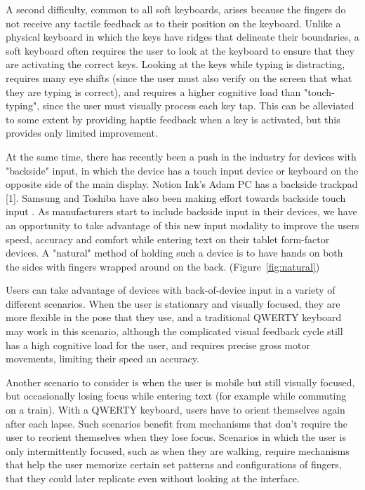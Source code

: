 A second difficulty, common to all soft keyboards, arises because the
fingers do not receive any tactile feedback as to their position on
the keyboard.  Unlike a physical keyboard in which the keys have
ridges that delineate their boundaries, a soft keyboard often requires
the user to look at the keyboard to ensure that they are activating
the correct keys.  Looking at the keys while typing is distracting,
requires many eye shifts (since the user must also verify on the
screen that what they are typing is correct), and requires a higher
cognitive load than "touch-typing", since the user must visually
process each key tap.  This can be alleviated to some extent by
providing haptic feedback when a key is activated, but this provides
only limited improvement.

At the same time, there has recently been a push in the industry for
devices with "backside" input, in which the device has a touch input
device or keyboard on the opposite side of the main display. Notion
Ink's Adam PC has a backside trackpad [1]. Samsung and Toshiba have
also been making effort towards backside touch input
. As manufacturers start to include backside input in their devices, we have an opportunity to take advantage of this new input modality to improve the users speed, accuracy and comfort while entering text on their tablet form-factor devices.  A "natural" method of holding such a device is to have hands on both the sides with fingers wrapped around on the back.
(Figure~\ref{fig:natural})

Users can take advantage of devices with back-of-device input in a variety
of different scenarios. When the user is stationary and visually
focused, they are more flexible in the pose that they use, and a
traditional QWERTY keyboard may work in this scenario, although the
complicated visual feedback cycle still has a high cognitive load for
the user, and requires precise gross motor movements, limiting their speed an accuracy. 

Another scenario to consider is when the user is mobile but still
visually focused, but occasionally losing focus while entering
text (for example while commuting on a train).  With a QWERTY keyboard,
users have to orient themselves again after each lapse. Such scenarios
benefit from mechanisms that don't require the user to reorient
themselves when they lose focus.  Scenarios in which the user is only
intermittently focused, such as when they are walking, require
mechanisms that help the user memorize certain set patterns and
configurations of fingers, that they could later replicate even without looking
at the interface. 

